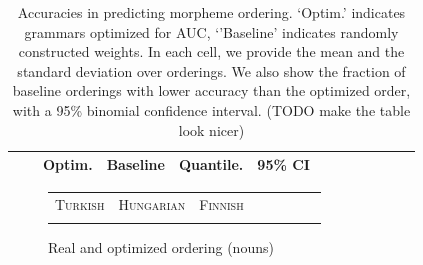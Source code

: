 \documentclass[11pt,letterpaper]{article}
\newcommand\mhahn[1]{{\color{red}(#1)}}
\begin{document}
\begin{table}[]
    \centering
    \begin{tabular}{l|l|ll|ll|lllllll}
     &   &     Optim. & Baseline & Quantile. & 95\% CI  \\ \hline
     
    \end{tabular}
    \caption{Accuracies in predicting morpheme ordering. `Optim.' indicates grammars optimized for AUC, `'Baseline' indicates randomly constructed weights.
    In each cell, we provide the mean and the standard deviation over orderings.
    We also show the fraction of baseline orderings with lower accuracy than the optimized order, with a 95\% binomial confidence interval.
    \mhahn{TODO make the table look nicer}
    }
    \label{tab:optimized_acc}
\end{table}



\begin{figure}[]
\begin{tabular}{cccccccc}
\textsc{Turkish} & \textsc{Hungarian} & \textsc{Finnish} \\
\begin{minipage}{.3\textwidth}
  
    \end{minipage}
  &
  \begin{minipage}{.3\textwidth}
  
    \end{minipage}
  &
  \begin{minipage}{.3\textwidth}
  
  \end{minipage}
  \end{tabular}
  
    \caption{Real and optimized ordering (nouns)}
    \label{fig:real_and_optimized_nouns}
\end{figure}
\end{document}
